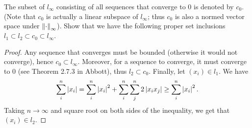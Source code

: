 \begin{exercise}{23}
The subset of $l_\infty$ consisting of all sequences that converge to 0 is denoted by $c_0$. (Note that $c_0$ is actually a linear subspace of $l_\infty$; thus $c_0$ is also a normed vector space under $\left\lVert \cdot\right\rVert_\infty$). Show that we have the following proper set inclusions $l_1\subset l_2\subset c_0\subset l_\infty$.
\end{exercise}
\begin{proof}
Any sequence that converges must be bounded (otherwise it would not converge), hence $c_0\subset l_\infty$. Moreover, for a sequence to converge, it must converge to 0 (see Theorem 2.7.3 in Abbott), thus $l_2\subset c_0$. Finally, let $(x_i)\in l_1$. We have
\[
\sum_i^n \left\lvert x_i\right\rvert = 
\sum_i^n \left\lvert x_i\right\rvert^2 + \sum_i^n\sum_j^n 2\left\lvert x_ix_j\right\rvert
\geq \sum_i^n \left\lvert x_i\right\rvert^2.
\]
Taking $n\to\infty$ and square root on both sides of the inequality, we get that $(x_i)\in l_2$.
\end{proof} 
